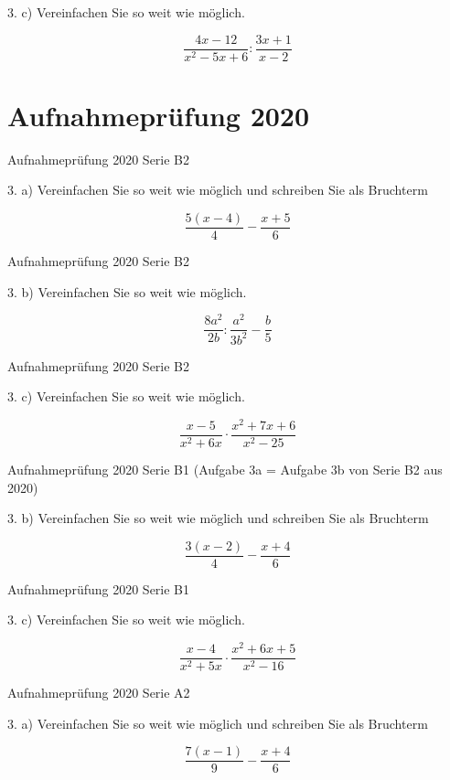 {3. c) Vereinfachen Sie so weit wie möglich.

$$\frac{4x-12}{x^2-5x+6} : \frac{3x+1}{x-2}$$

\section*{Aufnahmeprüfung 2020}
Aufnahmeprüfung 2020 Serie B2

3. a) Vereinfachen Sie so weit wie möglich und schreiben Sie als Bruchterm

$$\frac{5(x-4)}{4} - \frac{x+5}{6}$$

Aufnahmeprüfung 2020 Serie B2

3. b) Vereinfachen Sie so weit wie möglich.

$$\frac{8a^2}{2b} : \frac{a^2}{3b^2} - \frac{b}{5}$$

Aufnahmeprüfung 2020 Serie B2

3. c) Vereinfachen Sie so weit wie möglich.

$$\frac{x-5}{x^2+6x} \cdot{} \frac{x^2+7x+6}{x^2-25}$$

Aufnahmeprüfung 2020 Serie B1
(Aufgabe 3a = Aufgabe 3b von Serie B2 aus 2020)

3. b) Vereinfachen Sie so weit wie möglich und schreiben Sie als Bruchterm

$$\frac{3(x-2)}{4} - \frac{x+4}{6}$$

Aufnahmeprüfung 2020 Serie B1

3. c) Vereinfachen Sie so weit wie möglich.

$$\frac{x-4}{x^2+5x} \cdot{} \frac{x^2+6x+5}{x^2-16}$$

Aufnahmeprüfung 2020 Serie A2

3. a) Vereinfachen Sie so weit wie möglich und schreiben Sie als Bruchterm

$$\frac{7(x-1)}{9} - \frac{x+4}{6}$$

}
